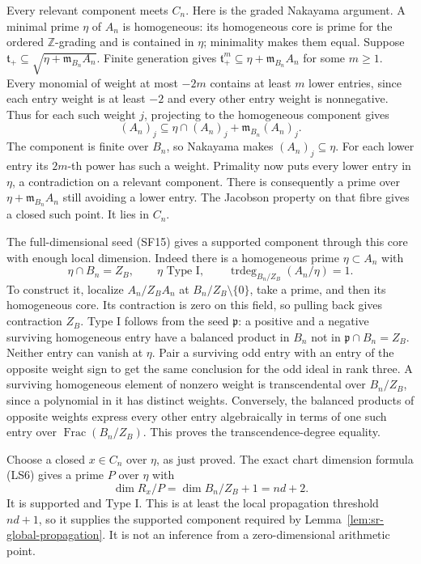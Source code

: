 Every relevant component meets \(C_n\).
Here is the graded Nakayama argument.
A minimal prime \(\eta\) of \(A_n\) is homogeneous:
its homogeneous core is prime for the ordered
\(\mathbb Z\)-grading and is contained in \(\eta\);
minimality makes them equal.
Suppose
\(\mathfrak t_+\subseteq
             \sqrt{\eta+\mathfrak m_{B_n}A_n}\).
Finite generation gives
\(\mathfrak t_+^m\subseteq\eta+\mathfrak m_{B_n}A_n\)
for some \(m\ge1\).
Every monomial of weight at most \(-2m\)
contains at least \(m\) lower entries, since
each entry weight is at least \(-2\) and
every other entry weight is nonnegative.
Thus for each such weight \(j\), projecting
to the homogeneous component gives
\[
 (A_n)_j\subseteq
          \eta\cap(A_n)_j+\mathfrak m_{B_n}(A_n)_j .
\]
The component is finite over \(B_n\), so
Nakayama makes \((A_n)_j\subseteq\eta\).
For each lower entry its \(2m\)-th power has
such a weight. Primality now puts every lower
entry in \(\eta\), a contradiction on a
relevant component.
There is consequently a prime over
\(\eta+\mathfrak m_{B_n}A_n\) still avoiding
a lower entry.
The Jacobson property on that fibre gives
a closed such point. It lies in \(C_n\).

The full-dimensional seed (SF15) gives a
supported component through this core with
enough local dimension.
Indeed there is a homogeneous prime
\(\eta\subset A_n\) with
\[
 \eta\cap B_n=Z_B,\qquad
 \eta\text{ Type I},\qquad
       \operatorname{trdeg}_{B_n/Z_B}(A_n/\eta)=1 .          \tag{SF18}
\]
To construct it, localize \(A_n/Z_BA_n\)
at \(B_n/Z_B\setminus\{0\}\), take a prime,
and then its homogeneous core.
Its contraction is zero on this field,
so pulling back gives contraction \(Z_B\).
Type I follows from the seed \(\mathfrak p\):
a positive and a negative surviving homogeneous
entry have a balanced product in \(B_n\)
not in \(\mathfrak p\cap B_n=Z_B\).
Neither entry can vanish at \(\eta\).
Pair a surviving odd entry with an entry of
the opposite weight sign to get the same
conclusion for the odd ideal in rank three.
A surviving homogeneous element of nonzero
weight is transcendental over \(B_n/Z_B\),
since a polynomial in it has distinct weights.
Conversely, the balanced products of opposite
weights express every other entry algebraically
in terms of one such entry over
\(\operatorname{Frac}(B_n/Z_B)\).
This proves the transcendence-degree equality.

Choose a closed \(x\in C_n\) over \(\eta\),
as just proved. The exact chart dimension
formula (LS6) gives a prime \(P\) over \(\eta\)
with
\[
        \dim R_x/P=\dim B_n/Z_B+1=nd+2 .
\]
It is supported and Type I.
This is at least the local propagation
threshold \(nd+1\), so it supplies the
supported component required by
Lemma~\ref{lem:sr-global-propagation}.
It is not an inference from a zero-dimensional
arithmetic point.

